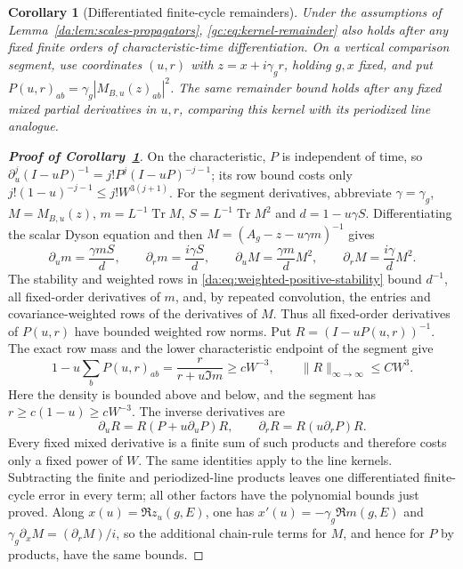 \documentclass[11pt]{article}
\numberwithin{equation}{section}
\newtheorem{corollary}[theorem]{Corollary}
\theoremstyle{remark}
\newcommand{\Tr}{\operatorname{Tr}}
\begin{document}
\begin{corollary}[Differentiated finite-cycle remainders]\label{da:cor:remainder-derivatives}
Under the assumptions of Lemma~\ref{da:lem:scales-propagators},
\eqref{gc:eq:kernel-remainder} also holds after any fixed finite
orders of characteristic-time differentiation. On a vertical comparison
segment, use coordinates $(u,r)$ with $z=x+i\gamma_g r$, holding $g,x$
fixed, and put $P(u,r)_{ab}=\gamma_g|M_{B,u}(z)_{ab}|^2$.
The same remainder bound holds after any fixed mixed partial derivatives
in $u,r$, comparing this kernel with its periodized line analogue.
\end{corollary}
\begin{proof}[\textbf{Proof of Corollary~\ref{da:cor:remainder-derivatives}}]
On the characteristic, $P$ is independent of time, so
$\partial_u^j(I-uP)^{-1}=j!P^j(I-uP)^{-j-1}$; its row bound costs only
$j!(1-u)^{-j-1}\le j!W^{3(j+1)}$.
For the segment derivatives, abbreviate $\gamma=\gamma_g$,
$M=M_{B,u}(z)$, $m=L^{-1}\Tr M$, $S=L^{-1}\Tr M^2$ and
$d=1-u\gamma S$. Differentiating the scalar Dyson equation and then
$M=(A_g-z-u\gamma m)^{-1}$ gives
\[
 \partial_u m=\frac{\gamma mS}{d},\qquad
 \partial_r m=\frac{i\gamma S}{d},\qquad
 \partial_u M=\frac{\gamma m}{d}M^2,\qquad
 \partial_r M=\frac{i\gamma}{d}M^2.
\]
The stability and weighted rows in \eqref{da:eq:weighted-positive-stability}
bound $d^{-1}$, all fixed-order derivatives of $m$, and, by repeated
convolution, the entries and covariance-weighted rows of the derivatives
of $M$. Thus all fixed-order derivatives of $P(u,r)$ have bounded
weighted row norms. Put $R=(I-uP(u,r))^{-1}$. The exact row mass and
the lower characteristic endpoint of the segment give
\[
 1-u\sum_bP(u,r)_{ab}
 =\frac{r}{r+u\Im m}\ge cW^{-3},\qquad \|R\|_{\infty\to\infty}\le CW^3.
\]
Here the density is bounded above and below, and the segment has
$r\ge c(1-u)\ge cW^{-3}$. The inverse derivatives are
\[
 \partial_uR=R(P+u\partial_uP)R,\qquad
 \partial_rR=R(u\partial_rP)R.
\]
Every fixed mixed derivative is a finite sum of such products and
therefore costs only a fixed power of $W$. The same identities apply
to the line kernels. Subtracting the finite and periodized-line products
leaves one differentiated finite-cycle error in every term; all other
factors have the polynomial bounds just proved.
Along $x(u)=\Re z_u(g,E)$, one has
$x'(u)=-\gamma_g\Re m(g,E)$ and
$\gamma_g\partial_xM=(\partial_rM)/i$, so the additional chain-rule
terms for $M$, and hence for $P$ by products, have the same bounds.


\end{proof}
\end{document}
